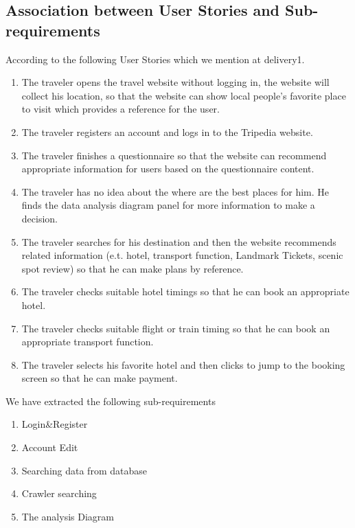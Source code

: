 \documentclass[conference]{IEEEtran}
\begin{document}
\subsection{\textbf{Association between User Stories and Sub-requirements}}
According to the following User Stories which we mention at delivery1.
\begin{enumerate}
	
	\item  The traveler opens the travel website without logging in, the website will collect his location, so that the website can show local people's favorite place to visit which provides a reference for the user.
	
	\item  The traveler registers an account and logs in to the Tripedia website.
	
	\item  The traveler finishes a questionnaire so that the website can recommend appropriate information for users based on the questionnaire content.
	
	\item  The traveler has no idea about the where are the best places for him. He finds the data analysis diagram panel for more information to make a decision.
	
	\item  The traveler searches for his destination and then the website recommends related information (e.t. hotel, transport function, Landmark Tickets, scenic spot review) so that he can make plans by reference.
	
	\item  The traveler checks suitable hotel timings so that he can book an appropriate hotel.
	
	\item  The traveler checks suitable flight or train timing so that he can book an appropriate transport function.
	
	\item  The traveler selects his favorite hotel and then clicks to jump to the booking screen so that he can make payment.
\end{enumerate}
We have extracted the following sub-requirements
\begin{enumerate}
	\item Login\&Register
	\item Account Edit
	\item Searching data from database
	\item Crawler searching
	\item The analysis Diagram
\end{enumerate}
\end{document}
